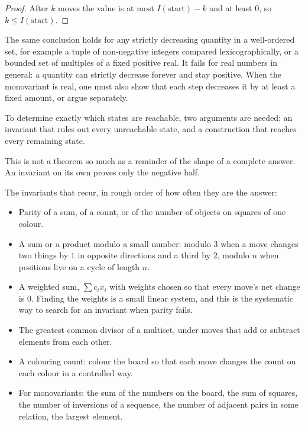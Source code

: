 \begin{proof}
After $k$ moves the value is at most $I(\text{start}) - k$ and at least $0$, so $k \le I(\text{start})$.
\end{proof}

The same conclusion holds for any strictly decreasing quantity in a well-ordered set, for example a tuple of non-negative integers compared lexicographically, or a bounded set of multiples of a fixed positive real. It fails for real numbers in general: a quantity can strictly decrease forever and stay positive. When the monovariant is real, one must also show that each step decreases it by at least a fixed amount, or argue separately.

\begin{proposition}
To determine exactly which states are reachable, two arguments are needed: an invariant that rules out every unreachable state, and a construction that reaches every remaining state.
\end{proposition}

This is not a theorem so much as a reminder of the shape of a complete answer. An invariant on its own proves only the negative half.

The invariants that recur, in rough order of how often they are the answer:

\begin{itemize}[nosep,leftmargin=*]
\item Parity of a sum, of a count, or of the number of objects on squares of one colour.
\item A sum or a product modulo a small number: modulo 3 when a move changes two things by $1$ in opposite directions and a third by $2$, modulo $n$ when positions live on a cycle of length $n$.
\item A weighted sum, $\sum c_i x_i$ with weights chosen so that every move's net change is $0$. Finding the weights is a small linear system, and this is the systematic way to search for an invariant when parity fails.
\item The greatest common divisor of a multiset, under moves that add or subtract elements from each other.
\item A colouring count: colour the board so that each move changes the count on each colour in a controlled way.
\item For monovariants: the sum of the numbers on the board, the sum of squares, the number of inversions of a sequence, the number of adjacent pairs in some relation, the largest element.
\end{itemize}

